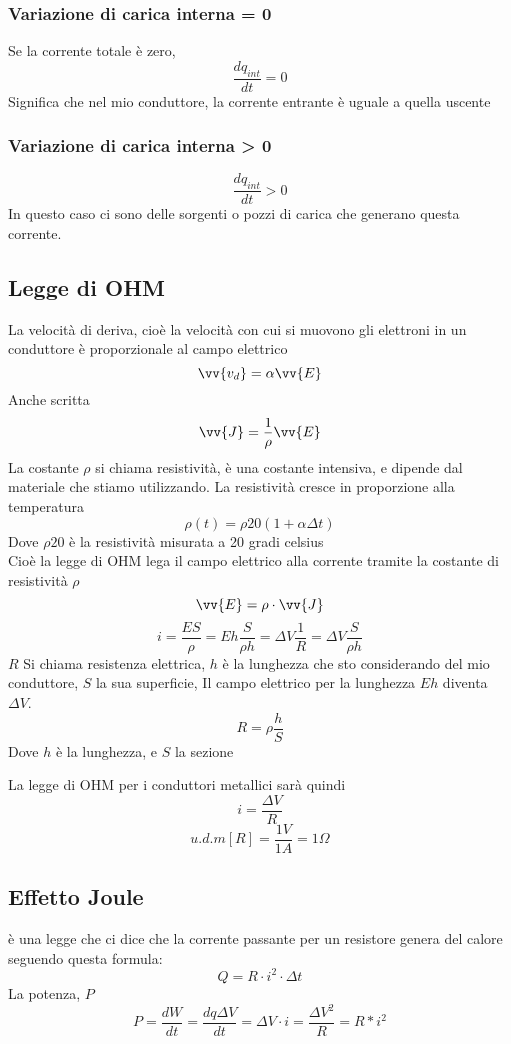 \documentclass[a4paper]{report}
\begin{document}
  \subsubsection{Variazione di carica interna = 0}
  Se la corrente totale è zero,
  $$\frac{dq_{int}}{dt} = 0$$
  Significa che nel mio conduttore, la corrente entrante è uguale a quella uscente
  \subsubsection{Variazione di carica interna > 0}
  $$\frac{dq_{int}}{dt} > 0$$
  In questo caso ci sono delle sorgenti o pozzi di carica che generano questa corrente.

  \subsection{Legge di OHM}
  La velocità di deriva, cioè la velocità con cui si muovono gli elettroni in un conduttore è proporzionale al campo elettrico
  $$ \vv{v_d} = \alpha \vv{E} $$
  Anche scritta
  $$ \vv{J} = \frac{1}{\rho} \vv{E} $$
  La costante $\rho$ si chiama resistività, è una costante intensiva, e dipende dal materiale che stiamo utilizzando.
  La resistività cresce in proporzione alla temperatura
  $$ \rho(t) = \rho{20}(1 + \alpha \Delta t) $$
  Dove $\rho{20}$ è la resistività misurata a 20 gradi celsius\\
  Cioè la legge di OHM lega il campo elettrico alla corrente tramite la costante di resistività $\rho$
  $$ \vv{E} = \rho \cdot \vv{J} $$
  $$ i = \frac{ES}{\rho} = Eh \frac{S}{\rho h} = \Delta V \frac{1}{R} = \Delta V \frac{S}{\rho h} $$
  $R$ Si chiama resistenza elettrica, $h$ è la lunghezza che sto considerando del mio conduttore, $S$ la sua superficie, Il campo elettrico per la lunghezza $Eh$ diventa $\Delta V$.
  $$ R = \rho \frac{h}{S} $$
  Dove $h$ è la lunghezza, e $S$ la sezione

  La legge di OHM per i conduttori metallici sarà quindi
  $$ i = \frac{\Delta V}{R} $$
  $$ u.d.m[R] = \frac{1V}{1A} = 1 \Omega $$

  \subsection{Effetto Joule}
  è una legge che ci dice che la corrente passante per un resistore genera del calore seguendo questa formula:
  $$ Q = R \cdot i^2 \cdot \Delta t$$
  La potenza, $P$
  $$ P=\frac{dW}{dt} = \frac{dq\Delta V}{dt} = \Delta V \cdot i = \frac{\Delta V^2}{R} = R*i^2$$
\end{document}
